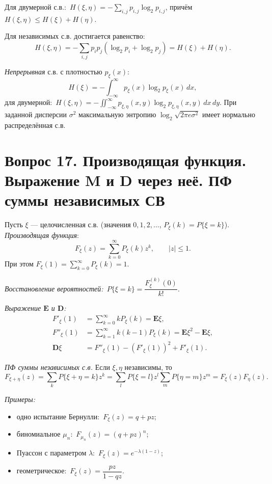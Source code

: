 Для двумерной с.в.:\ $H(\xi,\eta)=-\sum_{i,j}p_{i,j}\log_2 p_{i,j}$, причём $H(\xi,\eta)\le H(\xi)+H(\eta)$.

Для независимых с.в. достигается равенство:
\[ H(\xi,\eta)=-\sum_{i,j}p_ip_j(\log_2 p_i+\log_2 p_j)=H(\xi)+H(\eta). \]

\textit{Непрерывная} с.в. с плотностью $p_\xi(x)$:
\[ H(\xi)=-\int_{-\infty}^{\infty}p_\xi(x)\log_2 p_\xi(x)\,dx, \]
для двумерной:\ $H(\xi,\eta)=-\iint_{-\infty}^{\infty}p_{\xi,\eta}(x,y)\log_2 p_{\xi,\eta}(x,y)\,dx\,dy$. При заданной дисперсии $\sigma^2$ максимальную энтропию $\log_2\sqrt{2\pi e\sigma^2}$ имеет нормально распределённая с.в.

\section*{Вопрос 17. Производящая функция. Выражение M и D через неё. ПФ суммы независимых СВ}

Пусть $\xi$ — целочисленная с.в. (значения $0,1,2,\dots$, $P_\xi(k)=P\{\xi=k\}$). \textit{Производящая функция}:
\[ F_\xi(z)=\sum_{k=0}^{\infty}P_\xi(k)z^k,\qquad |z|\le1. \]
При этом $F_\xi(1)=\sum_{k=0}^{\infty}P_\xi(k)=1$.

\textit{Восстановление вероятностей:}\ $P\{\xi=k\}=\dfrac{F_\xi^{(k)}(0)}{k!}$.

\textit{Выражение $\mathbf{E}$ и $\mathbf{D}$:}
\begin{align*}
F'_\xi(1)&=\sum_{k=0}^{\infty}kP_\xi(k)=\mathbf{E}\xi,\\
F''_\xi(1)&=\sum_{k=1}^{\infty}k(k-1)P_\xi(k)=\mathbf{E}\xi^2-\mathbf{E}\xi,\\
\mathbf{D}\xi&=F''_\xi(1)-(F'_\xi(1))^2+F'_\xi(1).
\end{align*}

\textit{ПФ суммы независимых с.в.} Если $\xi,\eta$ независимы, то
\[ F_{\xi+\eta}(z)=\sum_k P\{\xi+\eta=k\}z^k=\sum_l P\{\xi=l\}z^l\sum_m P\{\eta=m\}z^m=F_\xi(z)F_\eta(z). \]

\textit{Примеры:}
\begin{itemize}
  \item одно испытание Бернулли:\ $F_\xi(z)=q+pz$;
  \item биномиальное $\mu_n$:\ $F_{\mu_n}(z)=(q+pz)^n$;
  \item Пуассон с параметром $\lambda$:\ $F_\xi(z)=e^{-\lambda(1-z)}$;
  \item геометрическое:\ $F_\xi(z)=\dfrac{pz}{1-qz}$.
\end{itemize}

